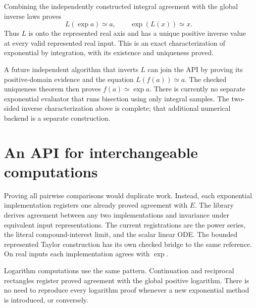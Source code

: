 Combining the independently constructed integral agreement with the global
inverse laws proves
\[
 L(\exp a)\simeq a,\qquad \exp(L(x))\simeq x.
\]
Thus $L$ is onto the represented real axis and has a unique positive inverse
value at every valid represented real input. This is an exact characterization
of exponential by integration, with its existence and uniqueness proved.

\leanok

A future independent algorithm that inverts $L$ can join the API by proving
its positive-domain evidence and the equation $L(f(a))\simeq a$. The checked
uniqueness theorem then proves $f(a)\simeq\exp a$. There is currently no
separate exponential evaluator that runs bisection using only integral
samples. The two-sided inverse characterization above is complete; that
additional numerical backend is a separate construction.

\section{An API for interchangeable computations}\label{sec:exponential-computation-api}

Proving all pairwise comparisons would duplicate work. Instead, each
exponential implementation registers one already proved agreement with
$E$. The library derives agreement between any two implementations and
invariance under equivalent input representations. The current registrations
are the power series, the literal compound-interest limit, and the scalar
linear ODE. The bounded represented Taylor construction has its own checked
bridge to the same reference. On real inputs each implementation agrees with
$\exp$.

\leanok

Logarithm computations use the same pattern. Continuation and reciprocal
rectangles register proved agreement with the global positive logarithm.
There is no need to reproduce every logarithm proof whenever a new exponential
method is introduced, or conversely.

